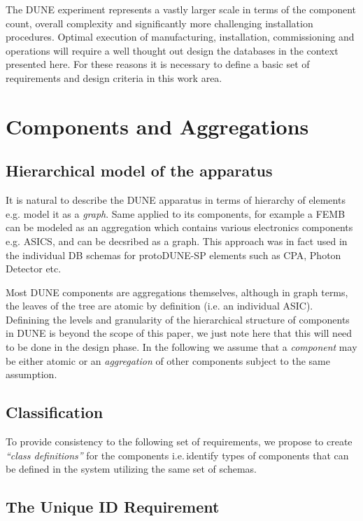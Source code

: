 \documentclass[pdftex,12pt,letter]{article}
\begin{document}
The DUNE experiment represents a vastly larger scale in terms of the component count,
overall complexity and significantly more challenging installation procedures. Optimal execution
of manufacturing, installation, commissioning and operations will require a well thought out design
the databases in the context presented here. For these reasons it is necessary to define a
basic set of requirements and design criteria in this work area.

\section{Components and Aggregations}
\subsection{Hierarchical model of the apparatus}

It is natural to describe the DUNE apparatus in terms of hierarchy of elements e.g. model it
as a \textit{graph}. Same applied to its components, for example a FEMB can be modeled as an
aggregation which contains various electronics components e.g. ASICS, and can be decsribed as a graph.
This approach was in fact used in the individual DB schemas for protoDUNE-SP elements such as CPA, Photon Detector etc.

Most DUNE components are aggregations themselves, although in graph terms, the leaves of the tree are atomic
by definition (i.e. an individual ASIC).  Definining the levels and granularity of the hierarchical structure of components
in DUNE is beyond the scope of this paper, we just note here that this will need to be done in the design phase.
In the following we assume that a \textit{component} may be either atomic or an \textit{aggregation} of other components
subject to the same assumption.

\subsection{Classification}
\label{classification}
To provide consistency to the following set of requirements, we propose to create \textit{``class definitions''} for the components
i.e.\,identify types of components that can be defined in the system utilizing the same set of schemas.


\subsection{The Unique ID Requirement}
\end{document}
